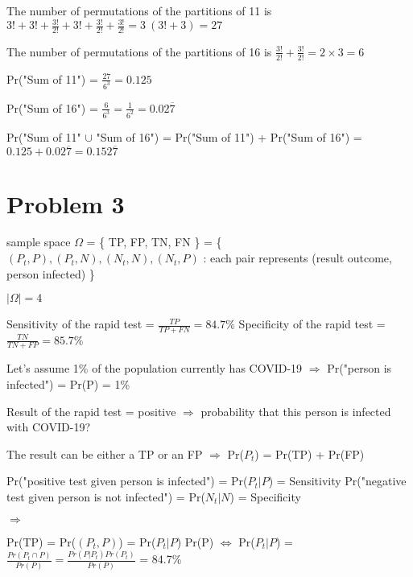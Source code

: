 \documentclass[11pt]{article}
\begin{document}
\bigskip
The number of permutations of the partitions of 11 is $ \displaystyle 3! + 3! + \frac{3!}{2!} + 3! + \frac{3!}{2!} + \frac{3!}{2!} = 3 \ (3! + 3) = 27 $

\bigskip
The number of permutations of the partitions of 16 is $ \displaystyle \frac{3!}{2!} +\frac{3!}{2!} = 2 \times 3 = 6 $

\bigskip
Pr("Sum of 11") = $ \displaystyle \frac{27}{6^3} = 0.125 $

\bigskip
Pr("Sum of 16") = $ \displaystyle \frac{6}{6^3} = \frac{1}{6^2} = 0.02\overline{7} $

\bigskip
Pr("Sum of 11" $\cup$ "Sum of 16") = Pr("Sum of 11") + Pr("Sum of 16") = $ 0.125 + 0.02\overline{7} = 0.152\overline{7} $

\newpage
\section{Problem 3}
sample space $\Omega$ = \{ TP, FP, TN, FN \} = \{ $(P_t,P), (P_t,N), (N_t,N), (N_t,P)$ : \newline
  \hspace*{1cm} each pair represents (result outcome, person infected) \}

\bigskip
\noindent
$ \displaystyle |\Omega| = 4 $

\bigskip
\noindent
Sensitivity of the rapid test = $ \displaystyle \frac{TP}{TP+FN} = 84.7\% $ \newline \newline
Specificity of the rapid test = $ \displaystyle \frac{TN}{TN+FP} = 85.7\% $

\bigskip
\noindent
Let's assume 1\% of the population currently has COVID-19 $\Rightarrow$ Pr("person is infected") = Pr(P) = 1\%

\bigskip
\noindent
Result of the rapid test = positive $\Rightarrow$ probability that this person is infected with COVID-19?

\bigskip
\bigskip
\noindent
The result can be either a TP or an FP $\Rightarrow$ Pr($P_t$) = Pr(TP) + Pr(FP)

\bigskip
\noindent
Pr("positive test given person is infected") = Pr($P_t | P$) = Sensitivity \newline
Pr("negative test given person is not infected") = Pr($N_t | N$) = Specificity

\bigskip
\noindent
$\Rightarrow$

\bigskip
\noindent
Pr(TP) = Pr($(P_t,P)$) = Pr($P_t | P$) Pr(P) $\iff$ Pr($P_t | P$) = $ \displaystyle\frac{Pr(P_t \cap P)}{Pr(P)} = \frac{Pr(P|P_t) Pr(P_t)}{Pr(P)}$ = 84.7\% \newline
\end{document}
